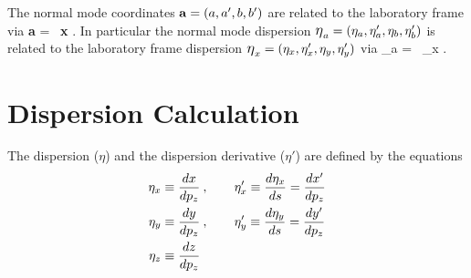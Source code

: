 The normal mode coordinates ${\bf a} = (a, a', b, b')$ are related to
the laboratory frame via
  \Begineq
    {\bf a} = \bfV\inv \, {\bf x}
    . \label{avx}
  \Endeq 
In particular the normal mode dispersion ${\mbox{\large$\eta$}}_a = (\eta_a,
\eta'_a, \eta_b, \eta'_b)$ is related to the laboratory frame
dispersion ${\mbox{\large$\eta$}}_x = (\eta_x, \eta'_x, \eta_y, \eta'_y)$ via
  \Begineq
    {\bfeta_a} = \bfV\inv \, {\bfeta_x}
    . \label{etaavx}
  \Endeq 

\section{Dispersion Calculation}
\label{s:dispersion}

The dispersion ($\eta$) and the dispersion derivative ($\eta'$) are 
defined by the equations
\begin{align}
  \eta_x &\equiv \frac{dx}{dp_z} \> , \qquad
    \eta'_x \equiv \frac{d\eta_x}{ds} = \frac{dx'}{dp_z} \nonumber \\
  \eta_y &\equiv \frac{dy}{dp_z} \> , \qquad
    \eta'_y \equiv \frac{d\eta_y}{ds} = \frac{dy'}{dp_z} \\
  \eta_z &\equiv \frac{dz}{dp_z} \nonumber
\end{align}

